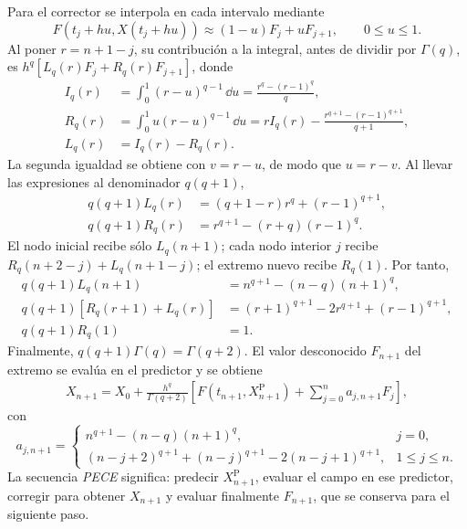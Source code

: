 Para el corrector se interpola en cada intervalo mediante
\[
 F(t_j+hu,X(t_j+hu))\approx(1-u)F_j+uF_{j+1},\qquad 0\leq u\leq1.
\]
Al poner \(r=n+1-j\), su contribución a la integral, antes de dividir por
\(\Gamma(q)\), es
\(h^q[L_q(r)F_j+R_q(r)F_{j+1}]\), donde
\begin{align}
 I_q(r)&=\int_0^1(r-u)^{q-1}\,\dd u
       =\frac{r^q-(r-1)^q}{q},\\
 R_q(r)&=\int_0^1u(r-u)^{q-1}\,\dd u
       =rI_q(r)-\frac{r^{q+1}-(r-1)^{q+1}}{q+1},\\
 L_q(r)&=I_q(r)-R_q(r).
 \label{eq:abm_integrales_pesos}
\end{align}
La segunda igualdad se obtiene con \(v=r-u\), de modo que
\(u=r-v\). Al llevar las expresiones al denominador \(q(q+1)\),
\begin{align}
 q(q+1)L_q(r)&=(q+1-r)r^q+(r-1)^{q+1},\\
 q(q+1)R_q(r)&=r^{q+1}-(r+q)(r-1)^q.
\end{align}
El nodo inicial recibe sólo \(L_q(n+1)\); cada nodo interior \(j\) recibe
\(R_q(n+2-j)+L_q(n+1-j)\); el extremo nuevo recibe \(R_q(1)\).
Por tanto,
\begin{align}
 q(q+1)L_q(n+1)&=n^{q+1}-(n-q)(n+1)^q,\\
 q(q+1)[R_q(r+1)+L_q(r)]
  &=(r+1)^{q+1}-2r^{q+1}+(r-1)^{q+1},\\
 q(q+1)R_q(1)&=1.
\end{align}
Finalmente, \(q(q+1)\Gamma(q)=\Gamma(q+2)\). El valor desconocido
\(F_{n+1}\) del extremo se evalúa en el predictor y se obtiene
\begin{equation}
\begin{aligned}
 X_{n+1}
 =X_0+\frac{h^q}{\Gamma(q+2)}
 \left[
 F\!\left(t_{n+1},X_{n+1}^{\mathrm P}\right)
 +\sum_{j=0}^{n}a_{j,n+1}F_j
 \right],
\end{aligned}
\label{eq:abm_corrector}
\end{equation}
con
\begin{equation}
a_{j,n+1}=
\begin{cases}
n^{q+1}-(n-q)(n+1)^q, & j=0,\\[0.25em]
(n-j+2)^{q+1}+(n-j)^{q+1}
-2(n-j+1)^{q+1}, & 1\leq j\leq n.
\end{cases}
\label{eq:pesos_abm}
\end{equation}
La secuencia \emph{PECE} significa: predecir \(X_{n+1}^{\mathrm P}\), evaluar
el campo en ese predictor, corregir para obtener \(X_{n+1}\) y evaluar
finalmente \(F_{n+1}\), que se conserva para el siguiente paso.

